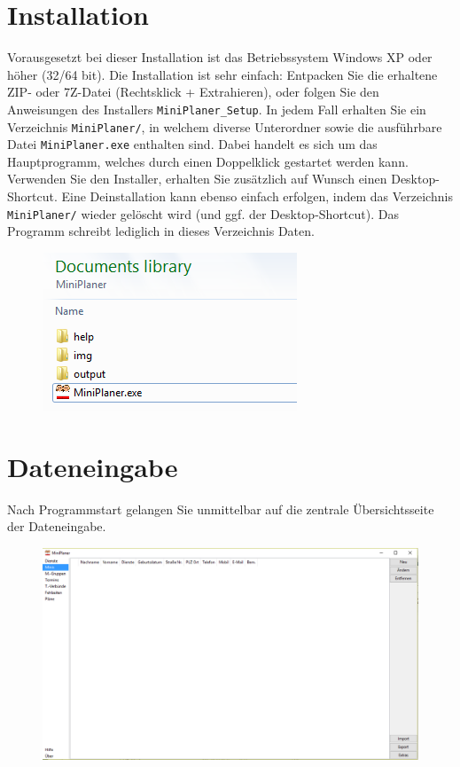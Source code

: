 \documentclass[a4paper,11pt]{article}
\begin{document}
\section{Installation}
Vorausgesetzt bei dieser Installation ist das Betriebssystem Windows XP oder höher (32/64 bit).
Die Installation ist sehr einfach: Entpacken Sie die erhaltene ZIP- oder 7Z-Datei (Rechtsklick + Extrahieren), oder folgen Sie den Anweisungen des Installers \texttt{MiniPlaner\_Setup}. In jedem Fall erhalten Sie ein Verzeichnis \texttt{MiniPlaner/}, in welchem diverse Unterordner sowie die ausführbare Datei \texttt{MiniPlaner.exe} enthalten sind. Dabei handelt es sich um das Hauptprogramm, welches durch einen Doppelklick gestartet werden kann. Verwenden Sie den Installer, erhalten Sie zusätzlich auf Wunsch einen Desktop-Shortcut. Eine Deinstallation kann ebenso einfach erfolgen, indem das Verzeichnis \texttt{MiniPlaner/} wieder gelöscht wird (und ggf. der Desktop-Shortcut). Das Programm schreibt lediglich in dieses Verzeichnis Daten.
\begin{figure}[ht]
\includegraphics[scale=0.7]{filesystem.PNG}
\end{figure}
\pagebreak
\section{Dateneingabe}
Nach Programmstart gelangen Sie unmittelbar auf die zentrale Übersichtsseite der Dateneingabe.
\begin{figure}[h]
\includegraphics[scale=0.4]{hauptfenster2.PNG}
\end{figure}
\end{document}
